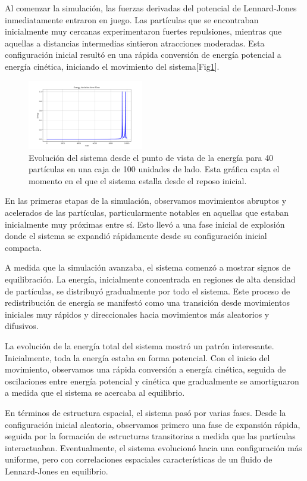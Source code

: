 \documentclass[twocolumn]{article}
\begin{document}
Al comenzar la simulación, las fuerzas derivadas del potencial de Lennard-Jones inmediatamente entraron en juego. Las partículas que se encontraban inicialmente muy cercanas experimentaron fuertes repulsiones, mientras que aquellas a distancias intermedias sintieron atracciones moderadas. Esta configuración inicial resultó en una rápida conversión de energía potencial a energía cinética, iniciando el movimiento del sistema[Fig\ref{fig:case2energia}].

\begin{figure}[]
    \centering
    \includegraphics[width=0.45\textwidth]{figures/variacion_energia_40p_10ki_10.png}
    \caption{Evolución del sistema desde el punto de vista de la energía para 40 partículas en una caja de 100 unidades de lado. Esta gráfica capta el momento en el que el sistema estalla desde el reposo inicial.}
    \label{fig:case2energia}
\end{figure}

En las primeras etapas de la simulación, observamos movimientos abruptos y acelerados de las partículas, particularmente notables en aquellas que estaban inicialmente muy próximas entre sí. Esto llevó a una fase inicial de explosión donde el sistema se expandió rápidamente desde su configuración inicial compacta.

A medida que la simulación avanzaba, el sistema comenzó a mostrar signos de equilibración. La energía, inicialmente concentrada en regiones de alta densidad de partículas, se distribuyó gradualmente por todo el sistema. Este proceso de redistribución de energía se manifestó como una transición desde movimientos iniciales muy rápidos y direccionales hacia movimientos más aleatorios y difusivos.

La evolución de la energía total del sistema mostró un patrón interesante. Inicialmente, toda la energía estaba en forma potencial. Con el inicio del movimiento, observamos una rápida conversión a energía cinética, seguida de oscilaciones entre energía potencial y cinética que gradualmente se amortiguaron a medida que el sistema se acercaba al equilibrio.

En términos de estructura espacial, el sistema pasó por varias fases. Desde la configuración inicial aleatoria, observamos primero una fase de expansión rápida, seguida por la formación de estructuras transitorias a medida que las partículas interactuaban. Eventualmente, el sistema evolucionó hacia una configuración más uniforme, pero con correlaciones espaciales características de un fluido de Lennard-Jones en equilibrio.
\end{document}
